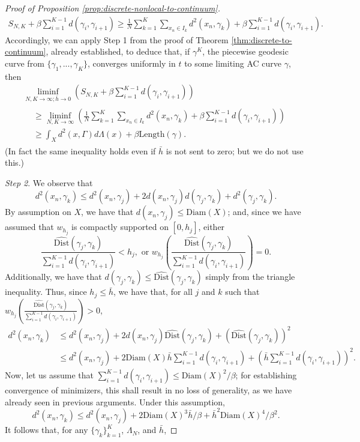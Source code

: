 \documentclass[10pt,a4paper]{amsart}
\begin{document}
\begin{proof}[Proof of Proposition \ref{prop:discrete-nonlocal-to-continuum}]
\begin{align*}
 S_{N,K}
+\beta\sum_{i=1}^{K-1}d(\gamma_{i},\gamma_{i+1})
\geq\frac{1}{N}\sum_{k=1}^{K}\sum_{x_{n}\in I_{k}}d^{2}(x_{n},\gamma_{k})+\beta\sum_{i=1}^{K-1}d(\gamma_{i},\gamma_{i+1}).
\end{align*}
Accordingly, we can apply Step 1 from the proof of Theorem \ref{thm:discrete-to-continuum},
already established, to deduce that,
 if $\gamma^{K}$, the piecewise geodesic curve from $\{\gamma_1, ..., \gamma_K\}$,  converges uniformly in $t$ to some limiting
AC curve $\gamma$, then
\begin{multline*}
\liminf_{N,K\rightarrow\infty;\bar{h}\rightarrow0}\left(
S_{N,K} +\beta\sum_{i=1}^{K-1}d(\gamma_{i},\gamma_{i+1})\right)\\
\begin{aligned}
& \geq\liminf_{N,K\rightarrow\infty}\left(\frac{1}{N}\sum_{k=1}^{K}\sum_{x_{n}\in I_{k}}d^{2}(x_{n},\gamma_{k})+\beta\sum_{i=1}^{K-1}d(\gamma_{i},\gamma_{i+1})\right)\\
 & \geq\int_{X}d^{2}(x,\Gamma)d\Lambda(x)+ \beta \text{Length}(\gamma).
\end{aligned}
\end{multline*}
(In fact the same inequality holds even if $\bar{h}$ is not sent
to zero; but we do not use this.)


\emph{Step 2}.
We observe that
\[
d^{2}(x_{n},\gamma_{k})\leq d^{2}(x_{n},\gamma_{j})+2d(x_{n},\gamma_{j})d(\gamma_{j},\gamma_{k})+d^{2}(\gamma_{j},\gamma_{k}).
\]
By assumption on $X$, we have that $d(x_{n},\gamma_{j})\leq\text{Diam}(X)$;
and, since we have assumed that  $w_{h_j}$ is compactly supported on $[0,h_j]$,
either
\[
\frac{\widehat{\text{Dist}}(\gamma_{j},\gamma_{k})}{\sum_{i=1}^{K-1}d(\gamma_{i},\gamma_{i+1})}<h_{j},\text{ or }w_{h_{j}}\left(\frac{\widehat{\text{Dist}}(\gamma_{j},\gamma_{k})}{\sum_{i=1}^{K-1}d(\gamma_{i},\gamma_{i+1})}\right)=0.
\]
Additionally, we have that $d(\gamma_{j},\gamma_{k})\leq\widehat{\text{Dist}}(\gamma_{j},\gamma_{k})$
simply from the triangle inequality. Thus, since $h_{j}\leq\bar{h}$,
we have that, for all $j$ and $k$ such that $w_{h_{j}}\left(\frac{\widehat{\text{Dist}}(\gamma_{j},\gamma_{k})}{\sum_{i=1}^{K-1}d(\gamma_{i},\gamma_{i+1})}\right)>0$,
\begin{align*}
d^{2}(x_{n},\gamma_{k}) & \leq d^{2}(x_{n},\gamma_{j})+2d(x_{n},\gamma_{j})\widehat{\text{Dist}}(\gamma_{j},\gamma_{k})+\left(\widehat{\text{Dist}}(\gamma_{j},\gamma_{k})\right)^{2}\\
 & \leq d^{2}(x_{n},\gamma_{j})+2\text{Diam}(X)\bar{h}\sum_{i=1}^{K-1}d(\gamma_{i},\gamma_{i+1})+\left(\bar{h}\sum_{i=1}^{K-1}d(\gamma_{i},\gamma_{i+1})\right)^{2}.
\end{align*}
Now, let us assume that $\sum_{i=1}^{K-1}d(\gamma_{i},\gamma_{i+1})\leq\text{Diam}(X)^{2}/\beta$;
for establishing convergence of minimizers, this shall result in no
loss of generality, as we have already seen in previous arguments.
Under this assumption,
\[
d^{2}(x_{n},\gamma_{k})\leq d^{2}(x_{n},\gamma_{j})+2\text{Diam}(X)^{3}\bar{h}/\beta+\bar{h}^{2}\text{Diam}(X)^{4}/\beta^2.
\]
It follows that, for any $\{\gamma_{k}\}_{k=1}^{K}$, $\Lambda_{N}$,
and $\bar{h}$,


\end{proof}
\end{document}
